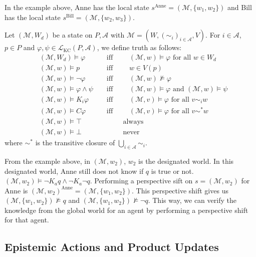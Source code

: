 In the example above, Anne has the local state $s^{\text{Anne}}=(\mathcal{M},\{w_1,w_2\})$ and Bill has the local state $s^{\text{Bill}}=(\mathcal{M},\{w_2,w_3\})$.


Let $(\mathcal{M}, W_d)$ be a state on $P,\mathcal{A}$ with $\mathcal{M}=(W, (\sim_i)_{i \in \mathcal{A}}, V)$. For $i \in \mathcal{A}$, $p \in P$ and $\varphi, \psi \in \mathcal{L}_{\text{KC}}(P,\mathcal{A})$, we define truth as follows:
\begin{align*}
  &(\mathcal{M}, W_d) \models \varphi
    & &\text{ iff } \qquad
    (\mathcal{M},w)\models \varphi \text{ for all } w \in W_d \\
  &(\mathcal{M}, w) \models p
    & &\text{ iff } \qquad
    w \in V(p) \\
  &(\mathcal{M}, w) \models \neg \varphi
    & &\text{ iff } \qquad
    (\mathcal{M},w) \not\models \varphi \\
  &(\mathcal{M}, w) \models \varphi \wedge \psi
    & &\text{ iff } \qquad
    (\mathcal{M},w) \models \varphi \text{ and } (\mathcal{M},w) \models \psi \\
  &(\mathcal{M}, w) \models K_i \varphi
    & &\text{ iff } \qquad
    (\mathcal{M},v) \models \varphi \text{ for all } v \sim_i w \\
  &(\mathcal{M}, w) \models C \varphi
    & &\text{ iff } \qquad
    (\mathcal{M},v) \models \varphi \text{ for all } v \sim^* w \\
  &(\mathcal{M}, w) \models \top
    & &\text{        } \qquad
    \text{always} \\
  &(\mathcal{M}, w) \models \bot
    & &\text{        } \qquad
    \text{never}
\end{align*}
where $\sim^*$ is the transitive closure of $\bigcup_{i \in \mathcal{A}}\sim_i$.


From the example above, in $(\mathcal{M},w_2)$, $w_2$ is the designated world. In this designated world, Anne still does not know if $q$ is true or not. $(\mathcal{M},w_2) \models \neg K_aq \wedge \neg K_a \neg q$.
Performing a perspective sift on $s=(\mathcal{M},w_2)$ for Anne is $(\mathcal{M},w_2)^{\text{Anne}} =(\mathcal{M},\{w_1,w_2\})$. This perspective shift gives us $(\mathcal{M},\{w_1,w_2\})\not\models q$ and $(\mathcal{M},\{w_1,w_2\})\not\models \neg q$. This way, we can verify the knowledge from the global world for an agent by performing a perspective shift for that agent.


\subsection{Epistemic Actions and Product Updates}

